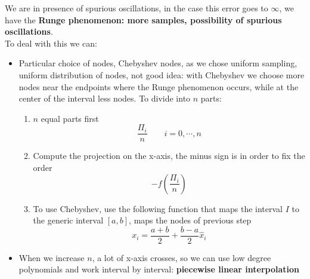     We are in presence of spurious oscillations, in the case this error goes to $\infty$, we have the \textbf{Runge phenomenon: more samples, possibility of spurious oscillations}.\\
    To deal with this we can:
    \begin{itemize}
        \item Particular choice of nodes, Chebyshev nodes, as we chose uniform sampling, uniform distribution of nodes, not good idea: with Chebyshev we choose more nodes near the endpoints where the Runge phenomenon occurs, while at the center of the interval less nodes. To divide into $n$ parts:
        \begin{enumerate}
            \item $n$ equal parts first
            $$
            \frac{\Pi_i}{n}\qquad i=0,\cdots,n
            $$
            \item Compute the projection on the x-axis, the minus sign is in order to fix the order
            $$
            -f\left(
                \frac{\Pi_i}{n} 
            \right)
            $$
            \item To use Chebyshev, use the following function that maps the interval $I$ to the generic interval $[a,b]$, maps the nodes of previous step
            $$
            x_i=\frac{a+b}{2}+\frac{b-a}{2}\hat{x}_i
            $$
        \end{enumerate}
        \item When we increase $n$, a lot of x-axis crosses, so we can use low degree polynomials and work interval by interval: \textbf{piecewise linear interpolation}
    \end{itemize}
    
